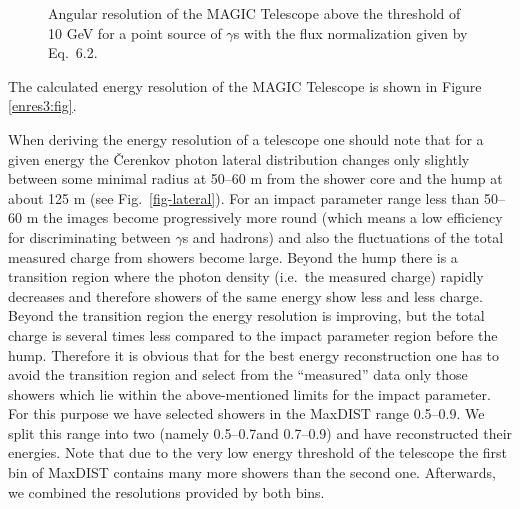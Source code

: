 \begin{figure}[h]
 \begin{center}
  \caption{Angular resolution of the MAGIC Telescope 
above the threshold of 10 GeV for a point source of $\gamma$s with the
flux normalization given by Eq.~6.2.}
  \label{angres:fig}
 \end{center}
\end{figure}


The calculated energy resolution of the MAGIC Telescope 
is shown in Figure \ref{enres3:fig}.

When deriving the energy resolution of a telescope one should
note that for a given energy the \v{C}erenkov photon lateral
distribution
changes only slightly between some minimal radius at 50--60 m
from the shower core and the hump at about 125 m (see Fig.~\ref{fig-lateral}). 
For an impact
parameter range less than 50--60 m the images become progressively
more round (which means a low efficiency for discriminating 
between  $\gamma$s
and  hadrons) and also the fluctuations of the total measured
charge from showers become large. Beyond the hump there is a transition
region where the photon density (i.e.\ the measured charge) rapidly
decreases and therefore showers of the same energy show less and
less charge. Beyond the transition region the energy
resolution is improving,
but the total
charge is several times  less
compared to the impact parameter region before the hump.  Therefore it is
obvious that for the best energy reconstruction one has to avoid the
transition region and select from the ``measured'' data only those
showers which lie within the above-mentioned limits for the impact
parameter. For this purpose we have selected showers in the MaxDIST
range 0.5\tdeg--0.9\tdeg. We split this range into two (namely
0.5\tdeg--0.7\tdeg and 0.7\tdeg--0.9\tdeg) and have reconstructed their
energies. Note that due to the very low energy threshold of the
telescope the first bin of MaxDIST contains many more showers than the
second one. Afterwards, we combined the resolutions provided by
both bins.

